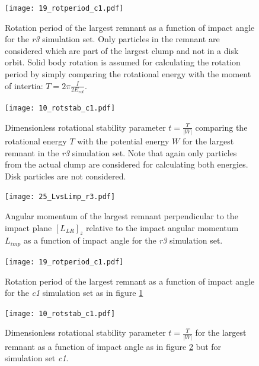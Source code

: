 \begin{landscape}
\begin{figure}[htbp]
\begin{center}
\texttt{[image: 19\_rotperiod\_c1.pdf]}
\caption{Rotation period of the largest remnant as a function of impact angle for the \emph{r3} simulation set. Only particles in the remnant are considered which are part of the largest clump and not in a disk orbit. Solid body rotation is assumed for calculating the rotation period by simply comparing the rotational energy with the moment of intertia: $T = 2 \pi \frac{I}{2 E_{rot}}$.}
\label{ch03_fig19a}
\end{center}
\end{figure}

\begin{figure}[htbp]
\begin{center}
\texttt{[image: 10\_rotstab\_c1.pdf]}
\caption{Dimensionless rotational stability parameter $t = \frac{T}{|W|}$ comparing the rotational energy $T$ with the potential energy $W$ for the largest remnant in the \emph{r3} simulation set. Note that again only particles from the actual clump are considered for calculating both energies. Disk particles are not considered.}
\label{ch03_fig10a}
\end{center}
\end{figure}

\begin{figure}[htbp]
\begin{center}
\texttt{[image: 25\_LvsLimp\_r3.pdf]}
\caption{Angular momentum of the largest remnant perpendicular to the impact plane $[L_{LR}]_z$ relative to the impact angular momentum $L_{imp}$ as a function of impact angle for the \emph{r3} simulation set.}
\label{ch03_fig25a}
\end{center}
\end{figure}


\begin{figure}[htbp]
\begin{center}
\texttt{[image: 19\_rotperiod\_c1.pdf]}
\caption{Rotation period of the largest remnant as a function of impact angle for the \emph{c1} simulation set as in figure \ref{ch03_fig19a} }
\label{ch03_fig19b}
\end{center}
\end{figure}

\begin{figure}[htbp]
\begin{center}
\texttt{[image: 10\_rotstab\_c1.pdf]}
\caption{Dimensionless rotational stability parameter $t = \frac{T}{|W|}$ for the largest remnant as a function of impact angle as in figure \ref{ch03_fig10a} but for simulation set \emph{c1}.}
\label{ch03_fig10b} 
\end{center}
\end{figure}


\end{landscape}
